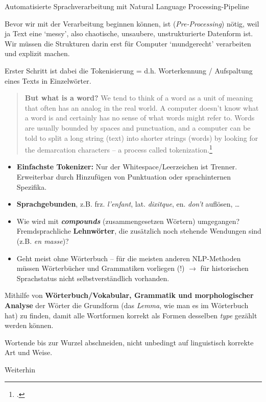 \begin{frame}[allowframebreaks]{Automatisierte Sprachverarbeitung mit Natural Language Processing-Pipeline}

Bevor wir mit der Verarbeitung beginnen können, ist 
\alert{(\emph{Pre-Processing})} 
nötig, weil ja Text eine `messy', also chaotische, unsaubere, unstrukturierte Datenform ist. Wir müssen die Strukturen darin erst für Computer `mundgerecht' verarbeiten und explizit machen.

Erster Schritt ist dabei die \alert{Tokenisierung} = d.h. Worterkennung / Aufspaltung eines Texts in Einzelwörter.

\begin{block}{}\footnotesize
\begin{quote}
    \textbf{But what is a word?} We tend to think of a word as a unit of meaning that often has an analog in the real world. \punkti A computer doesn't know what a word is and certainly has no sense of what words might refer to.
    \punkti 
    Words are usually bounded by spaces and punctuation, and a computer can be told to split a long string (text) into shorter strings (words) by looking for the demarcation characters \punkti -- a process called tokenization.\footcite[283]{textvisual}
\end{quote}
\end{block}

\smallskip

\begin{itemize}\footnotesize
    \item \textbf{Einfachste Tokenizer:} Nur der Whitespace/Leerzeichen ist Trenner. Erweiterbar durch Hinzufügen von Punktuation oder sprachinternen Spezifika.
    \item \textbf{Sprachgebunden}, z.B. frz. \emph{l'enfant}, lat. \emph{dixitque}, en. \emph{don't} auflösen, \dots 
    \item Wie wird mit \textbf{\emph{compounds}} (zusammengesetzen Wörtern) umgegangen? Fremdsprachliche \textbf{Lehnwörter}, die zusätzlich noch stehende Wendungen sind (z.B. \emph{en masse})?
    \item Geht meist ohne Wörterbuch -- für die meisten anderen NLP-Methoden müssen Wörterbücher und Grammatiken vorliegen (!) $\to$ für historischen Sprachstatus nicht selbstverständlich vorhanden.
\end{itemize}


\framebreak

 Mithilfe von \textbf{Wörterbuch/Vokabular, Grammatik und morphologischer Analyse} der Wörter die Grundform (das \emph{Lemma}, wie man es im Wörterbuch hat) zu finden, damit alle Wortformen korrekt als Formen desselben \emph{type} gezählt werden können.

\bigskip

 Wortende bis zur Wurzel abschneiden, nicht unbedingt auf linguistisch korrekte Art und Weise.

Weiterhin 


\end{frame}
